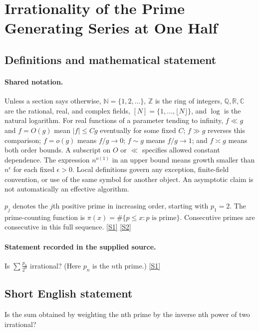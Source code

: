 \documentclass[11pt,a4paper]{article}
\newcommand{\N}{\mathbb{N}}
\newcommand{\Z}{\mathbb{Z}}
\newcommand{\Q}{\mathbb{Q}}
\newcommand{\R}{\mathbb{R}}
\newcommand{\C}{\mathbb{C}}
\newcommand{\sref}[2]{\hyperlink{source:#1:#2}{[S#2]}}
\begin{document}
\section{Irrationality of the Prime Generating Series at One Half}\label{statement}


\subsection{Definitions and mathematical statement}

\paragraph{Shared notation.}Unless a section says otherwise, $\N=\{1,2,\ldots\}$,
$\Z$ is the ring of integers, $\Q,\R,\C$ are the rational, real, and complex
fields, $[N]=\{1,\ldots,\lfloor N\rfloor\}$, and $\log$ is the natural
logarithm. For real functions of a parameter tending to infinity,
$f\ll g$ and $f=O(g)$ mean $|f|\leq Cg$ eventually for some fixed $C$;
$f\gg g$ reverses this comparison; $f=o(g)$ means $f/g\to0$;
$f\sim g$ means $f/g\to1$; and $f\asymp g$ means both order bounds.
A subscript on $O$ or $\ll$ specifies allowed constant dependence.
The expression $n^{o(1)}$ in an upper bound means growth smaller than
$n^\epsilon$ for each fixed $\epsilon>0$. Local definitions govern any
exception, finite-field convention, or use of the same symbol for another
object. An asymptotic claim is not automatically an effective algorithm.



$p_j$ denotes the $j$th positive prime in increasing order, starting with $p_1=2$. The prime-counting function is $\pi(x)=\#\{p\leq x:p\text{ is prime}\}$. Consecutive primes are consecutive in this full sequence. \sref{statement}{1} \sref{statement}{2}

\paragraph{Statement recorded in the supplied source.}
Is $ \sum \frac{p_n}{2^n} $ irrational? (Here $p_n$ is the $n$th prime.) \sref{statement}{1}

\subsection{Short English statement}

Is the sum obtained by weighting the nth prime by the inverse nth power of two irrational?
\end{document}
